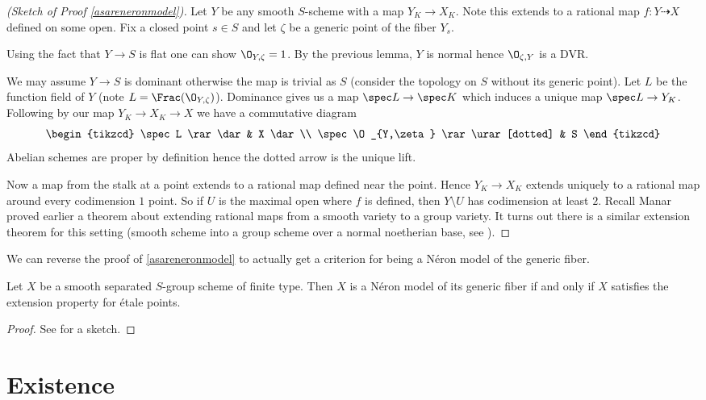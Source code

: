 \documentclass[11pt]{article}
\newcommand{\neron}{N\'{e}ron }
\newcommand{\etale}{\'{e}tale }
\begin{document}
\begin{proof}[(Sketch of Proof \autoref{asareneronmodel})]
	Let $Y$ be any smooth $S$-scheme with a map $Y_K \to X_K$. Note this extends to a rational map $f:Y \dashrightarrow X$ defined on some open. Fix a closed point $s\in S$ and let $\zeta$ be a generic point of the fiber $Y_s$.
	
	Using the fact that $Y \to S$ is flat one can show $\O_{Y,\zeta} = 1$. By the previous lemma, $Y$ is normal hence $\O_{\zeta,Y}$ is a DVR.
	
	We may assume $Y \to S$ is dominant otherwise the map is trivial as $S$ (consider the topology on $S$ without its generic point). Let $L$ be the function field of $Y$ (note $L = \Frac(\O_{Y,\zeta})$). Dominance gives us a map $\spec L \to \spec K$ which induces a unique map $\spec L \to Y_K$. Following by our map $Y_K \to X_K \to X$ we have a commutative diagram
	$$
	\begin{tikzcd}
		\spec L \rar\dar & X \dar
		\\
		\spec \O_{Y,\zeta} \rar\urar[dotted] & S
	\end{tikzcd}
	$$
	Abelian schemes are proper by definition hence the dotted arrow is the unique lift.
	
	Now a map from the stalk at a point extends to a rational map defined near the point. Hence $Y_K \to X_K$ extends uniquely to a rational map around every codimension $1$ point. So if $U$ is the maximal open where $f$ is defined, then $Y \setminus U$ has codimension at least $2$. Recall Manar proved earlier a theorem about extending rational maps from a smooth variety to a group variety. It turns out there is a similar extension theorem for this setting (smooth scheme into a group scheme over a normal noetherian base, see \cite[Thm.~4.4/1]{bosch2012neron}).
\end{proof}

We can reverse the proof of \autoref{asareneronmodel} to actually get a criterion for being a \neron model of the generic fiber.

\begin{prop}
	Let $X$ be a smooth separated $S$-group scheme of finite type. Then $X$ is a \neron model of its generic fiber if and only if $X$ satisfies the extension property for \etale points.
\end{prop}
\begin{proof}
	See \cite[Crit.~1.2/9]{bosch2012neron} for a sketch.
\end{proof}

\section{Existence}
\end{document}
